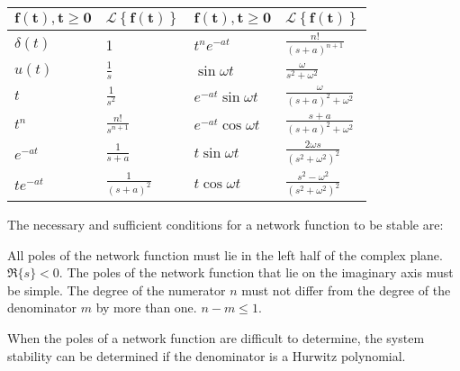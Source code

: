 \documentclass{report}
\newcommand{\Laplace}[1]{\mathcal{L}\left\{#1\right\}}
\newcommand{\lap}[1]{\Laplace{#1}}
\begin{document}
\begin{table}[H]
	\renewcommand{\arraystretch}{2}
	\centering
	\begin{tabular}[c]{ll|ll}
		$\bm{f(t), t \geq 0}$     & $\bm{\lap{f(t)}}$                  & $\bm{f(t), t \geq 0}$                & $\bm{\lap{f(t)}}$                                         \\
		\hline
		$\displaystyle \delta(t)$ & 1                                  & $\displaystyle t^ne^{-at}$           & $\displaystyle \frac{n!}{(s+a)^{n+1}}$                    \\
		$\displaystyle u(t)$      & $\displaystyle \frac{1}{s}$        & $\displaystyle \sin\omega t$         & $\displaystyle \frac{\omega}{s^2 + \omega^2}$             \\
		$\displaystyle t$         & $\displaystyle \frac{1}{s^2}$      & $\displaystyle e^{-at}\sin \omega t$ & $\displaystyle \frac{\omega}{(s+a)^2 + \omega^2}$         \\
		$\displaystyle t^n$       & $\displaystyle \frac{n!}{s^{n+1}}$ & $\displaystyle e^{-at}\cos \omega t$ & $\displaystyle \frac{s+a}{(s+a)^2 + \omega^2}$            \\
		$\displaystyle e^{-at}$   & $\displaystyle \frac{1}{s+a}$      & $\displaystyle t \sin \omega t$      & $\displaystyle \frac{2\omega s}{(s^2 + \omega^2)^2}$      \\
		$\displaystyle te^{-at}$  & $\displaystyle \frac{1}{(s+a)^2}$  & $\displaystyle t \cos \omega t$      & $\displaystyle \frac{s^2 - \omega^2}{(s^2 + \omega^2)^2}$ \\
	\end{tabular}
\end{table}

The necessary and sufficient conditions for a network function to be stable are:
\begin{itemize}
	\ii All poles of the network function must lie in the left half of the complex plane. $\Re\{s\} < 0$.
	\ii The poles of the network function that lie on the imaginary axis must be simple.
	\ii The degree of the numerator $n$ must not differ from the degree of the denominator $m$ by more than one. $n-m \leq 1$.
\end{itemize}

When the poles of a network function are difficult to determine, the system stability can be determined if the denominator is a Hurwitz polynomial.

\end{document}
